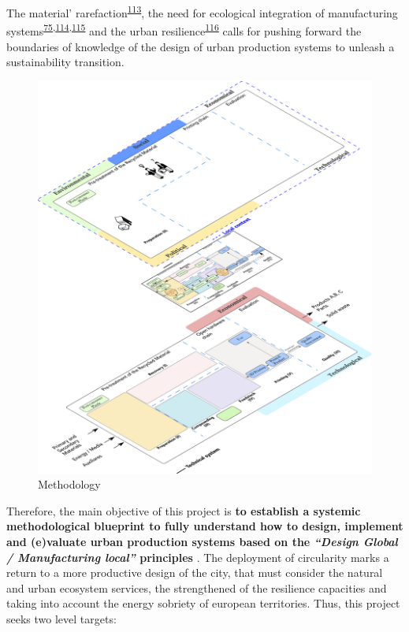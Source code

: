 \documentclass[
  12pt,
  a4paperpaper,
  onecolumn]{article}
\begin{document}
The material'
rarefaction\textsuperscript{\protect\hyperlink{ref-hultman2021}{113}},
the need for ecological integration of manufacturing
systems\textsuperscript{\protect\hyperlink{ref-Bakshi2019a}{75},\protect\hyperlink{ref-Bakshi2015}{114},\protect\hyperlink{ref-Saladini2018}{115}}
and the urban
resilience\textsuperscript{\protect\hyperlink{ref-xu2021e}{116}} calls
for pushing forward the boundaries of knowledge of the design of urban
production systems to unleash a sustainability transition.

\begin{figure}
\centering
    \includegraphics[width=\linewidth]{Figures/Levels.png}
    \caption{Methodology}
    \label{fig:levels}
\end{figure}

Therefore, the main objective of this project is \textbf{to establish a
systemic methodological blueprint to fully understand how to design,
implement and (e)valuate urban production systems based on the
\emph{``Design Global / Manufacturing local''} principles }. The
deployment of circularity marks a return to a more productive design of
the city, that must consider the natural and urban ecosystem services,
the strengthened of the resilience capacities and taking into account
the energy sobriety of european territories. Thus, this project seeks
two level targets:
\end{document}
